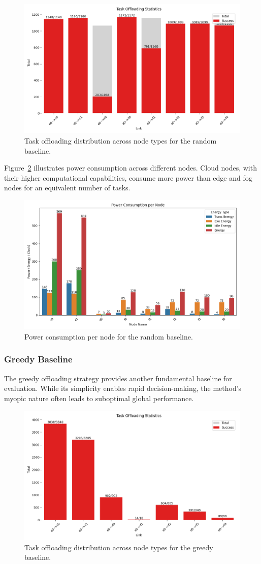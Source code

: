 \documentclass[preprint,3p,authoryear]{elsarticle}
\begin{document}
\begin{figure}[H]
    \centering
    \includegraphics[width=0.5\linewidth]{figs/Random/task_offloading_statistics.png}
    \caption{Task offloading distribution across node types for the random baseline.}
    \label{fig:random-task-offloading-stats}
\end{figure}

Figure~\ref{fig:random-power-consumption} illustrates power consumption across different nodes. Cloud nodes, with their higher computational capabilities, consume more power than edge and fog nodes for an equivalent number of tasks.

\begin{figure}[H]
    \centering
    \includegraphics[width=0.5\linewidth]{figs/Random/power_consumption_per_node.png}
    \caption{Power consumption per node for the random baseline.}
    \label{fig:random-power-consumption}
\end{figure}


\subsubsection{Greedy Baseline}
\label{subsec:greedy-baseline}

The greedy offloading strategy provides another fundamental baseline for evaluation. While its simplicity enables rapid decision-making, the method's myopic nature often leads to suboptimal global performance.

\begin{figure}[H]
    \centering
    \includegraphics[width=0.5\linewidth]{figs/Greedy/task_offloading_statistics.png}
    \caption{Task offloading distribution across node types for the greedy baseline.}
    \label{fig:greedy-task-offloading-stats}
\end{figure}
\end{document}
